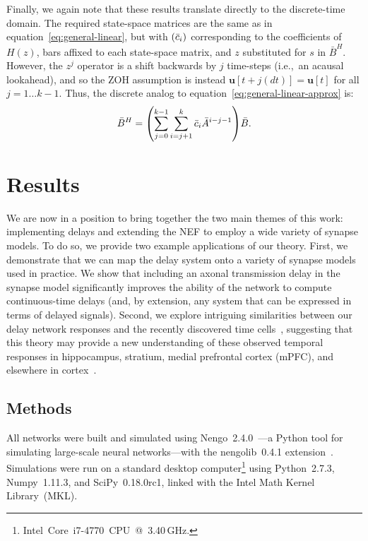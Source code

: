 \documentclass[12pt]{article}
\theoremstyle{definition}
\renewcommand{\vec}{\mathbf}  %
\let\originalleft\left
\let\originalright\right
\renewcommand{\left}{\mathopen{}\mathclose\bgroup\originalleft}
\renewcommand{\right}{\aftergroup\egroup\originalright}
\begin{document}
Finally, we again note that these results translate directly to the discrete-time domain.
The required state-space matrices are the same as in equation~\ref{eq:general-linear}, but with $\left( \bar{c}_i \right)$ corresponding to the coefficients of $H(z)$, bars affixed to each state-space matrix, and $z$ substituted for $s$ in $\bar{B}^H$.
However, the $z^j$ operator is a shift backwards by $j$ time-steps (i.e.,~an acausal lookahead), and so the ZOH assumption is instead $\vec{u}[t+j(dt)] = \vec{u}[t]$ for all $j = 1 \ldots k - 1$.
Thus, the discrete analog to equation~\ref{eq:general-linear-approx} is:
\begin{equation}
\bar{B}^H = \left( \sum_{j=0}^{k-1} \sum_{i=j+1}^k \bar{c}_i \bar{A}^{i-j-1} \right) \bar{B} \text{.}
\end{equation}

\section{Results}
\label{sec:results}

We are now in a position to bring together the two main themes of this work: implementing delays and extending the NEF to employ a wide variety of synapse models.
To do so, we provide two example applications of our theory.
First, we demonstrate that we can map the delay system onto a variety of synapse models used in practice.
We show that including an axonal transmission delay in the synapse model significantly improves the ability of the network to compute continuous-time delays (and, by extension, any system that can be expressed in terms of delayed signals).
Second, we explore intriguing similarities between our delay network responses and the recently discovered time cells~\citep{eichenbaum2014, tiganj2016sequential}, suggesting that this theory may provide a new understanding of these observed temporal responses in hippocampus, stratium, medial prefrontal cortex (mPFC), and elsewhere in cortex~\citep{mello2015scalable, luczak2015packet}.

\subsection{Methods}
\label{sec:methods}

All networks were built and simulated using Nengo~2.4.0~\citep{bekolay2013nengo}---a Python tool for simulating large-scale neural networks---with the nengolib~0.4.1 extension~\citep{nengolib, voelker2017neuromorphic}.
Simulations were run on a standard desktop computer\footnote{
Intel\textregistered{}~Core\texttrademark{}~i7-4770~CPU~@~3.40\,GHz.}
using Python~2.7.3, Numpy~1.11.3, and SciPy~0.18.0rc1, linked with the Intel Math Kernel Library~(MKL).
\end{document}
